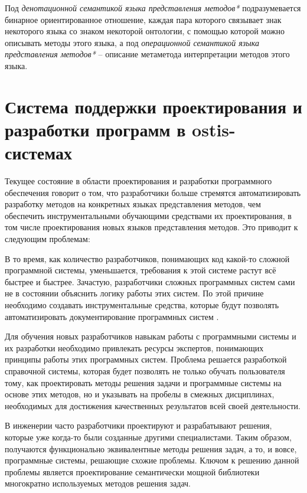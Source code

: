 Под \textit{денотационной семантикой языка представления методов*} подразумевается бинарное ориентированное отношение, каждая пара которого связывает знак некоторого языка со знаком некоторой онтологии, с помощью которой можно описывать методы этого языка, а под \textit{операционной семантикой языка представления методов*} -- описание метаметода интерпретации методов этого языка.

\section{Система поддержки проектирования и разработки программ в ostis-системах}
\label{sec_programs_help_system}

Текущее состояние в области проектирования и разработки программного обеспечения говорит о том, что разработчики больше стремятся автоматизировать разработку методов на конкретных языках представления методов, чем обеспечить инструментальными обучающими средствами их проектирования, в том числе проектирования новых языков представления методов. Это приводит к следующим проблемам:
\begin{textitemize}
	\item В то время, как количество разработчиков, понимающих код какой-то сложной программной системы, уменьшается, требования к этой системе растут всё быстрее и быстрее. Зачастую, разработчики сложных программных систем сами не в состоянии объяснить логику работы этих систем. По этой причине необходимо создавать инструментальные средства, которые будут позволять автоматизировать документирование программных систем \cite{lu2022rethinking}.
	\item Для обучения новых разработчиков навыкам работы с программными системы и их разработки необходимо привлекать ресурсы экспертов, понимающих принципы работы этих программных систем. Проблема решается разработкой справочной системы, которая будет позволять не только обучать пользователя тому, как проектировать методы решения задачи и программные системы на основе этих методов, но и указывать на пробелы в смежных дисциплинах, необходимых для достижения качественных результатов всей своей деятельности.
	\item В инженерии часто разработчики проектируют и разрабатывают решения, которые уже когда-то были созданные другими специалистами. Таким образом, получаются функционально эквивалентные методы решения задач, а то, и вовсе, программные системы, решающие схожие проблемы. Ключом к решению данной проблемы является проектирование семантически мощной библиотеки многократно используемых методов решения задач.
\end{textitemize}

